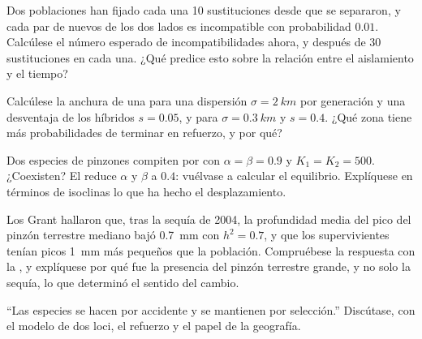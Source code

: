 \begin{exercise}[$\star\star$]\label{exo:b2:speciation:8}
Dos poblaciones han fijado cada una 10 sustituciones desde que se
separaron, y cada par de  nuevos de los dos lados es incompatible
con probabilidad $0.01$. Calcúlese el número esperado de
incompatibilidades ahora, y después de 30 sustituciones en cada una. ¿Qué
predice esto sobre la relación entre el aislamiento y el tiempo?
\end{exercise}

\begin{exercise}[$\star\star$]\label{exo:b2:speciation:9}
Calcúlese la anchura de una  para una dispersión $\sigma =
\qty{2}{km}$ por generación y una desventaja de los híbridos $s = 0.05$, y
para $\sigma = \qty{0.3}{km}$ y $s = 0.4$. ¿Qué zona tiene más
probabilidades de terminar en refuerzo, y por qué?
\end{exercise}

\begin{exercise}[$\star\star\star$]\label{exo:b2:speciation:10}
Dos especies de pinzones compiten por  con $\alpha = \beta = 0.9$ y
$K_1 = K_2 = 500$. ¿Coexisten? El  reduce
$\alpha$ y $\beta$ a $0.4$: vuélvase a calcular el equilibrio. Explíquese
en términos de isoclinas lo que ha hecho el desplazamiento.
\end{exercise}

\begin{exercise}[$\star\star\star$]\label{exo:b2:speciation:11}
Los Grant hallaron que, tras la sequía de 2004, la profundidad media del
pico del pinzón terrestre mediano bajó \qty{0.7}{mm} con $h^{2} = 0.7$,
y que los supervivientes tenían picos \qty{1}{mm} más pequeños que la
población. Compruébese la respuesta con la , y
explíquese por qué fue la presencia del pinzón terrestre grande, y no solo
la sequía, lo que determinó el sentido del cambio.
\end{exercise}

\begin{exercise}[$\star\star\star$]\label{exo:b2:speciation:12}
``Las especies se hacen por accidente y se mantienen por selección.''
Discútase, con el modelo de dos loci, el refuerzo y el papel de la
geografía.
\end{exercise}

